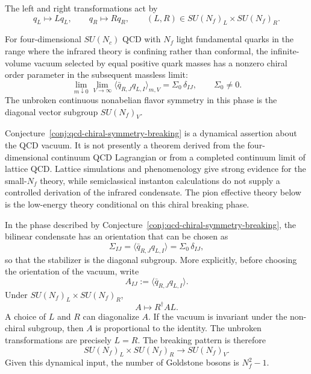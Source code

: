 The left and right transformations act by
\[
  q_L\longmapsto Lq_L,
  \qquad
  q_R\longmapsto Rq_R,
  \qquad
  (L,R)\in SU(N_f)_L\times SU(N_f)_R .
\]

\begin{conjecture}
\label{conj:qcd-chiral-symmetry-breaking}
For four-dimensional \(SU(N_c)\) QCD with \(N_f\) light fundamental quarks in
the range where the infrared theory is confining rather than conformal, the
infinite-volume vacuum selected by equal positive quark masses has a nonzero
chiral order parameter in the subsequent massless limit:
\begin{equation}
  \lim_{m\downarrow0}\lim_{V\to\infty}
  \langle \bar q_{R,J}q_{L,I}\rangle_{m,V}
  =
  \Sigma_0\,\delta_{IJ},
  \qquad
  \Sigma_0\neq0 .
  \label{eq:qcd-chiral-condensate-conjecture}
\end{equation}
The unbroken continuous nonabelian flavor symmetry in this phase is the
diagonal vector subgroup \(SU(N_f)_V\).
\end{conjecture}

Conjecture~\ref{conj:qcd-chiral-symmetry-breaking} is a dynamical assertion
about the QCD vacuum.  It is not presently a theorem derived from the
four-dimensional continuum QCD Lagrangian or from a completed continuum limit
of lattice QCD.  Lattice simulations and phenomenology give strong evidence
for the small-\(N_f\) theory, while semiclassical instanton calculations do
not supply a controlled derivation of the infrared condensate.  The pion
effective theory below is the low-energy theory conditional on this chiral
breaking phase.

In the phase described by
Conjecture~\ref{conj:qcd-chiral-symmetry-breaking}, the bilinear condensate has
an orientation that can be chosen as
\[
  \Sigma_{IJ}
  =
  \langle \bar q_{R,J}q_{L,I}\rangle
  =
  \Sigma_0\,\delta_{IJ},
\]
so that the stabilizer is the diagonal subgroup.  More explicitly, before
choosing the orientation of the vacuum, write
\[
  A_{IJ}:=\langle\bar q_{R,J}q_{L,I}\rangle .
\]
Under \(SU(N_f)_L\times SU(N_f)_R\),
\[
  A\longmapsto R^\dagger A L .
\]
A choice of \(L\) and \(R\) can diagonalize \(A\).  If the vacuum is invariant
under the non-chiral subgroup, then \(A\) is proportional to the identity.
The unbroken transformations are precisely \(L=R\).  The breaking pattern is
therefore
\begin{equation}
  SU(N_f)_L\times SU(N_f)_R
  \longrightarrow
  SU(N_f)_V .
  \label{eq:qcd-chiral-breaking-pattern}
\end{equation}
Given this dynamical input, the number of Goldstone bosons is \(N_f^2-1\).

